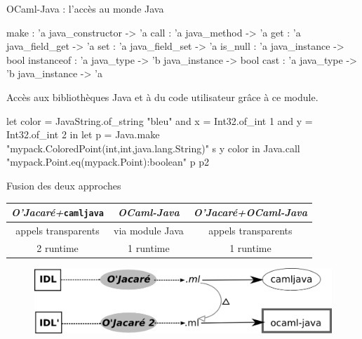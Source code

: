 \documentclass[xcolor={table,dvipsnames}]{beamer}
\newcommand{\camljava}{{\tt{camljava}}}
\begin{document}
\begin{frame}[fragile]{OCaml-Java : l'accès au monde Java}
\begin{OCamlEx}
make : 'a java_constructor -> 'a 
call : 'a java_method -> 'a 
get : 'a java_field_get -> 'a 
set : 'a java_field_set -> 'a 
is_null : 'a java_instance -> bool 
instanceof : 'a java_type -> 'b java_instance -> bool
cast : 'a java_type -> 'b java_instance -> 'a
\end{OCamlEx}

Accès aux bibliothèques Java et à du code utilisateur grâce à ce module.

\begin{OCamlEx}
let color = JavaString.of_string "bleu"
and x = Int32.of_int 1
and y = Int32.of_int 2 in
let p = Java.make "mypack.ColoredPoint(int,int,java.lang.String)" s y color 
in
   Java.call "mypack.Point.eq(mypack.Point):boolean" p p2
\end{OCamlEx}


\end{frame}


\begin{frame}{Fusion des deux approches}

\begin{tabular}{|c|c@{\,\vrule width 6pt\,}c|}
  \hline
   \cellcolor[gray]{0.6}\emph{O'Jacaré+}\camljava & \cellcolor[gray]{0.6}\emph{OCaml-Java}& \cellcolor[gray]{0.6} \emph{O'Jacaré+OCaml-Java}\\
  \hline\hline
 \cellcolor[gray]{0.9} appels transparents & via module Java & \cellcolor[gray]{0.9}appels transparents\\
\hline
  2 runtime &\cellcolor[gray]{0.9} 1 runtime&\cellcolor[gray]{0.9} 1 runtime \\
\hline
\end{tabular}
\begin{figure}[h]
  \centering
  \includegraphics[scale=1]{schema1.png}
\end{figure}

\end{frame}
\end{document}
